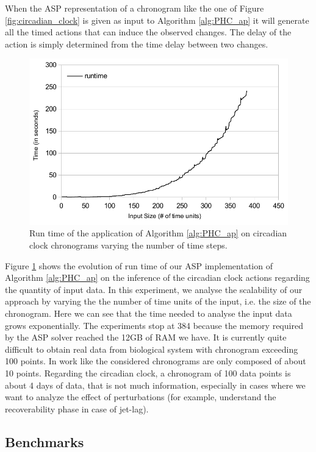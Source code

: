 When the ASP representation of a chronogram like the one of Figure \ref{fig:circadian_clock} is given as input to Algorithm \ref{alg:PHC_ap} it will generate all the timed actions that can induce the observed changes.
The delay of the action is simply determined from the time delay between two changes.

\begin{figure}[htb!]
\begin{center}
\includegraphics[width=0.6\linewidth]{images/circadian_run_time}
\end{center}
\caption{Run time of the application of Algorithm \ref{alg:PHC_ap} on circadian clock chronograms varying the number of time steps.}
\label{fig:run_time}
\end{figure}

Figure \ref{fig:run_time} shows the evolution of run time of our ASP implementation of Algorithm \ref{alg:PHC_ap} on the inference of the circadian clock actions regarding the quantity of input data.
In this experiment, we analyse the scalability of our approach by varying the the number of time units of the input, i.e. the size of the chronogram.
Here we can see that the time needed to analyse the input data grows exponentially.
The experiments stop at 384 because the memory required by the ASP solver reached the 12GB of RAM we have.
It is currently quite difficult to obtain real data from biological system with chronogram exceeding 100 points.
In work like \cite{Fippo14} the considered chronograms are only composed of about 10 points.
Regarding the circadian clock, a chronogram of 100 data points is about 4 days of data, that is not much information, especially in cases where we want to analyze the effect of perturbations (for example, understand the recoverability phase in case of jet-lag). 

\subsection{Benchmarks}
